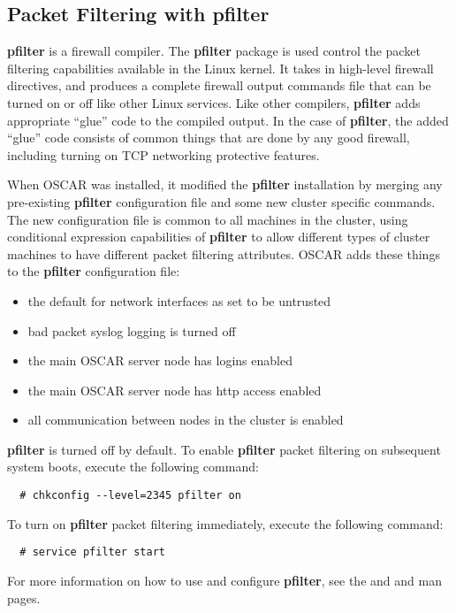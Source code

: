 %
%
%

\subsection{Packet Filtering with pfilter}
\label{app:pfilter-overview}

{\bf pfilter} is a firewall compiler.  The {\bf pfilter} package is
used control the packet filtering capabilities available in the Linux
kernel.  It takes in high-level firewall directives, and produces a
complete firewall output commands file that can be turned on or off
like other Linux services.  Like other compilers, {\bf pfilter} adds
appropriate ``glue'' code to the compiled output.  In the case of {\bf
  pfilter}, the added ``glue'' code consists of common things that are
done by any good firewall, including turning on TCP networking
protective features.

When OSCAR was installed, it modified the {\bf pfilter} installation
by merging any pre-existing {\bf pfilter} configuration file and some
new cluster specific commands.  The new configuration file is common
to all machines in the cluster, using conditional expression
capabilities of {\bf pfilter} to allow different types of cluster
machines to have different packet filtering attributes.  OSCAR adds
these things to the {\bf pfilter} configuration file:

\begin{itemize}
\item the default for network interfaces as set to be untrusted
\item bad packet syslog logging is turned off
\item the main OSCAR server node has  logins enabled
\item the main OSCAR server node has http access enabled
\item all communication between nodes in the cluster is enabled
\end{itemize}

{\bf pfilter} is turned off by default. To enable {\bf pfilter} packet
filtering on subsequent system boots, execute the following command:

\begin{verbatim}
  # chkconfig --level=2345 pfilter on
\end{verbatim}

To turn on {\bf pfilter} packet filtering immediately, execute the
following command:

\begin{verbatim}
  # service pfilter start
\end{verbatim}

For more information on how to use and configure {\bf pfilter}, see
the  and  and
 man pages.

